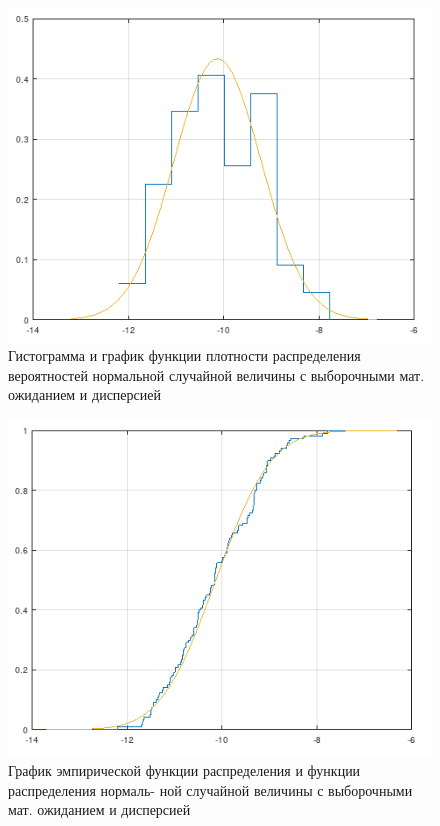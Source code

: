 \begin{figure}[H]
	\begin{center}
		\includegraphics[scale=0.78]{assets/fst.png}
	\end{center}
	\caption{Гистограмма и график функции плотности распределения вероятностей нормальной случайной величины с выборочными мат. ожиданием и дисперсией}
\end{figure}

\begin{figure}[H]
	\begin{center}
		\includegraphics[scale=0.78]{assets/scnd.png}
	\end{center}
	\caption{График эмпирической функции распределения и функции распределения нормаль-
		ной случайной величины с выборочными мат. ожиданием и дисперсией}
\end{figure}